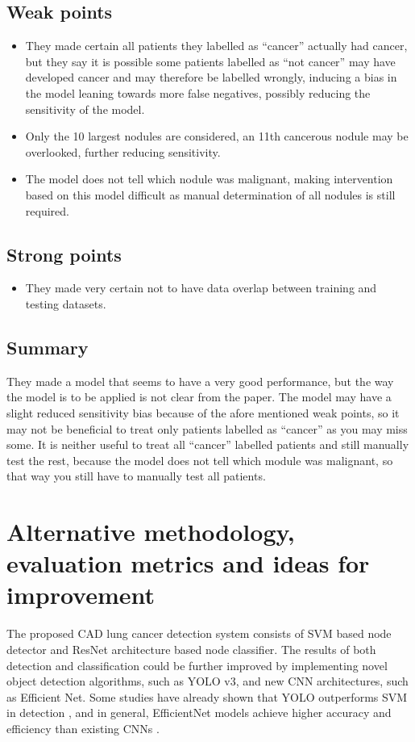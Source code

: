 \documentclass{article}
\begin{document}
\subsection{Weak points}
\begin{itemize}
  \item They made certain all patients they labelled as ``cancer'' actually had cancer, but they say it is possible some patients labelled as ``not cancer'' may have developed cancer and may therefore be labelled wrongly, inducing a bias in the model leaning towards more false negatives, possibly reducing the sensitivity of the model.
  \item Only the 10 largest nodules are considered, an 11th cancerous nodule may be overlooked, further reducing sensitivity.
  \item The model does not tell which nodule was malignant, making intervention based on this model difficult as manual determination of all nodules is still required.
\end{itemize}


\subsection{Strong points}
\begin{itemize}
  \item They made very certain not to have data overlap between training and testing datasets.
\end{itemize}


\subsection{Summary}
They made a model that seems to have a very good performance, but the way the model is to be applied is not clear from the paper. The model may have a slight reduced sensitivity bias because of the afore mentioned weak points, so it may not be beneficial to treat only patients labelled as ``cancer'' as you may miss some. It is neither useful to treat all ``cancer'' labelled patients and still manually test the rest, because the model does not tell which module was malignant, so that way you still have to manually test all patients. 


\section{Alternative methodology, evaluation metrics and ideas for improvement}
The proposed CAD lung cancer detection system consists of SVM based node detector and ResNet architecture based node classifier. The results of both detection and classification could be further improved by implementing novel object detection algorithms, such as YOLO v3, and new CNN architectures, such as Efficient Net. Some studies have already shown that YOLO outperforms SVM in detection \cite{inproceedings}, and in general, EfficientNet models achieve higher accuracy and efficiency than existing CNNs \cite{google-AI}.
\end{document}
